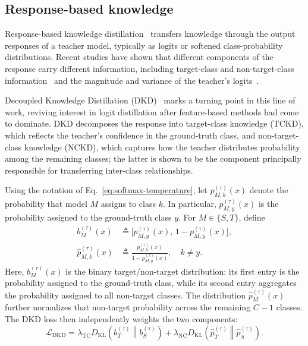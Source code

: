 \documentclass[review,number,sort&compress]{elsarticle}
\theoremstyle{definition}
\begin{document}
\subsection{Response-based knowledge}
Response-based knowledge distillation~\citep{hinton2015distilling} transfers knowledge through the output responses of a teacher model, typically as logits or softened class-probability distributions. Recent studies have shown that different components of the response carry different information, including target-class and non-target-class information~\citep{zhao2022decoupled} and the magnitude and variance of the teacher's
logits~\citep{sun2024logit}.

Decoupled Knowledge Distillation (DKD)~\citep{zhao2022decoupled} marks a turning point in this line of work, reviving interest in logit distillation after feature-based methods had come to dominate. DKD decomposes the response into target-class knowledge (TCKD), which reflects the teacher's confidence in the ground-truth class, and non-target-class knowledge (NCKD), which captures how the teacher distributes probability among the remaining classes; the latter is shown to be the component principally responsible for transferring inter-class relationships.

Using the notation of Eq.~\eqref{eq:softmax-temperature}, let
$p_{M,k}^{(\tau)}(x)$ denote the probability that model $M$ assigns to class
$k$. In particular, $p_{M,y}^{(\tau)}(x)$ is the probability assigned to the
ground-truth class $y$. For $M\in\{S,T\}$, define
\begin{equation}
\begin{aligned}
b_M^{(\tau)}(x)
&\triangleq \bigl[p_{M,y}^{(\tau)}(x),\,1-p_{M,y}^{(\tau)}(x)\bigr], \\
\hat p_{M,k}^{(\tau)}(x)
&\triangleq \frac{p_{M,k}^{(\tau)}(x)}{1-p_{M,y}^{(\tau)}(x)},
\quad k\neq y.
\end{aligned}
\end{equation}
Here, $b_M^{(\tau)}(x)$ is the binary target/non-target distribution: its
first entry is the probability assigned to the ground-truth class, while its
second entry aggregates the probability assigned to all non-target classes.
The distribution $\hat p_M^{(\tau)}(x)$ further normalizes that non-target
probability across the remaining $C-1$ classes.
The DKD loss then independently weights the two components:
\begin{equation}
\label{eq:dkd-loss}
\mathcal L_{\mathrm{DKD}}
= \lambda_{\mathrm{TC}}D_{\mathrm{KL}}\!\left(b_T^{(\tau)}\middle\|b_S^{(\tau)}\right)
+ \lambda_{\mathrm{NC}}D_{\mathrm{KL}}\!\left(\hat p_T^{(\tau)}\middle\|\hat p_S^{(\tau)}\right).
\end{equation}
\end{document}
